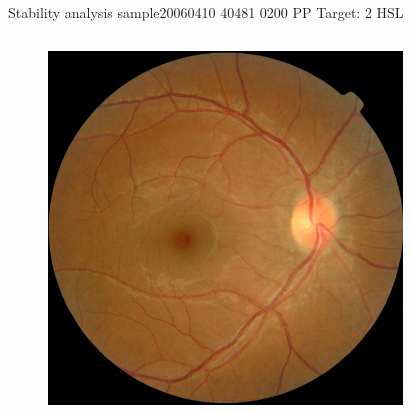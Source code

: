 \documentclass{beamer}
\begin{document}
\begin{frame}{Stability analysis sample}{20060410 40481 0200 PP Target: 2 HSL}
\begin{columns}
\begin{column}{0.3\textwidth}
\begin{figure}[p]
\centering
\includegraphics[width=\textwidth]{chapter_stability/20060410_40481_0200_PP/20060410_40481_0200_PP.jpeg}
\end{figure}	
\end{column}
\begin{column}{0.45\textwidth}  %
\begin{figure}[p]
\centering

\end{figure}
\end{column}
\end{columns}
\end{frame}
\end{document}
